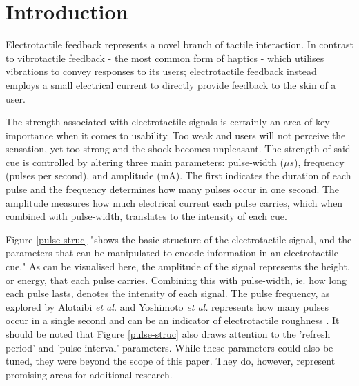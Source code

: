 \documentclass{mpaper}
\begin{document}
\section{Introduction}\label{sec:intro}

Electrotactile feedback represents a novel branch of tactile interaction. In contrast to vibrotactile feedback - the most common form of haptics - which utilises vibrations to convey responses to its users; electrotactile feedback instead employs a small electrical current to directly provide feedback to the skin of a user.

The strength associated with electrotactile signals is certainly an area of key importance when it comes to usability. Too weak and users will not perceive the sensation, yet too strong and the shock becomes unpleasant. The strength of said cue is controlled by altering three main parameters: pulse-width (${\mu}s$), frequency (pulses per second), and amplitude (mA). The first indicates the duration of each pulse and the frequency determines how many pulses occur in one second. The amplitude measures how much electrical current each pulse carries, which when combined with pulse-width, translates to the intensity of each cue.

Figure \ref{pulse-struc} "shows the basic structure of the electrotactile signal, and the parameters that can be manipulated to encode information in an electrotactile cue." \cite{10.1145/3491102.3501863} As can be visualised here, the amplitude of the signal represents the height, or energy, that each pulse carries. Combining this with pulse-width, ie. how long each pulse lasts, denotes the intensity of each signal. The pulse frequency, as explored by Alotaibi \emph{et al.} and Yoshimoto \emph{et al.} represents how many pulses occur in a single second and can be an indicator of electrotactile roughness \cite{10.1145/3491102.3501863, yoshimoto}. It should be noted that Figure \ref{pulse-struc} also draws attention to the 'refresh period' and 'pulse interval' parameters. While these parameters could also be tuned, they were beyond the scope of this paper. They do, however, represent promising areas for additional research.
\end{document}
